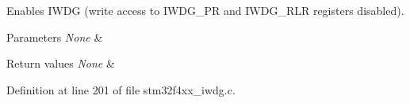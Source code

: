 Enables I\-W\-D\-G (write access to I\-W\-D\-G\-\_\-\-P\-R and I\-W\-D\-G\-\_\-\-R\-L\-R registers disabled). 


\begin{DoxyParams}{Parameters}
{\em None} & \\
\hline
\end{DoxyParams}

\begin{DoxyRetVals}{Return values}
{\em None} & \\
\hline
\end{DoxyRetVals}


Definition at line 201 of file stm32f4xx\-\_\-iwdg.\-c.


